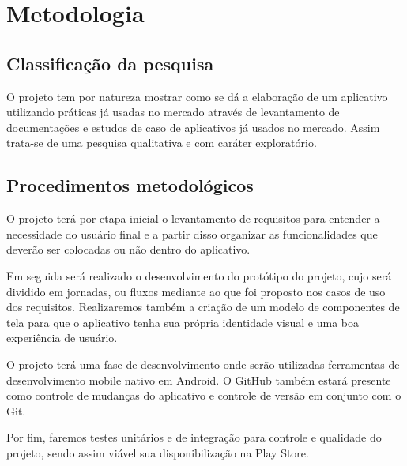 \chapter{Metodologia}\label{ch:metodologia}

\section{Classificação da pesquisa}\label{sec:classificacao-da-pesquisa}

O projeto tem por natureza mostrar como se dá a elaboração de um aplicativo utilizando práticas já usadas no mercado através de levantamento de documentações e estudos de caso de aplicativos já usados no mercado.
Assim trata-se de uma pesquisa qualitativa e com caráter exploratório.

\section{Procedimentos metodológicos}\label{sec:procedimentos-metodologicos}

O projeto terá por etapa inicial o levantamento de requisitos para entender a necessidade do usuário final e a partir disso organizar as funcionalidades que deverão ser colocadas ou não dentro do aplicativo.

Em seguida será realizado o desenvolvimento do protótipo do projeto, cujo será dividido em jornadas, ou fluxos mediante ao que foi proposto nos casos de uso dos requisitos.
Realizaremos também a criação de um modelo de componentes de tela para que o aplicativo tenha sua própria identidade visual e uma boa experiência de usuário.

O projeto terá uma fase de desenvolvimento onde serão utilizadas ferramentas de desenvolvimento mobile nativo em Android.
O GitHub também estará presente como controle de mudanças do aplicativo e controle de versão em conjunto com o Git.

Por fim, faremos testes unitários e de integração para controle e qualidade do projeto, sendo assim viável sua disponibilização na Play Store.
